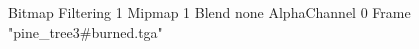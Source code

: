 {Bitmap
	{Filtering 1}
	{Mipmap 1}
	{Blend none}
	{AlphaChannel 0}
	{Frame "pine_tree3#burned.tga"}
}
